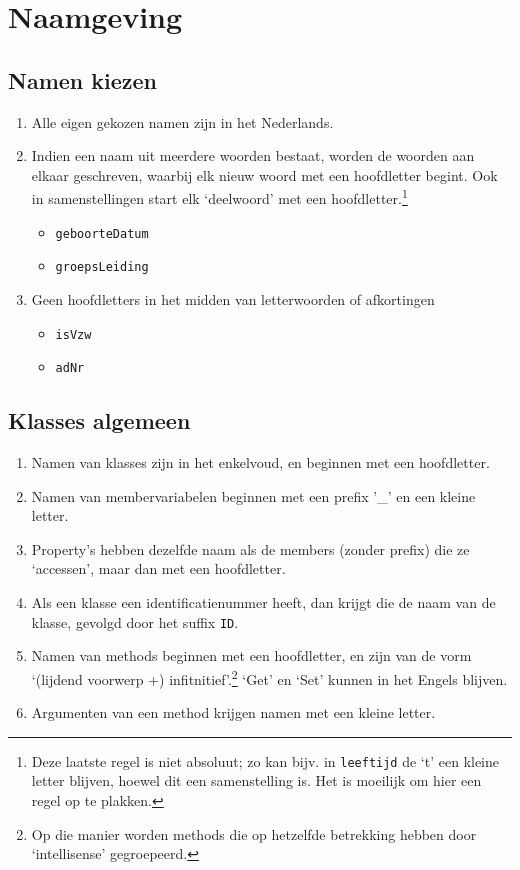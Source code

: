 \documentclass[a4paper,11pt]{article}
\begin{document}
\section{Naamgeving}

\subsection{Namen kiezen}

\begin{enumerate}[resume]
\item Alle eigen gekozen namen zijn in het Nederlands. 
\item Indien een naam uit meerdere woorden bestaat, worden de woorden aan elkaar geschreven,
waarbij elk nieuw woord met een hoofdletter begint.  Ook in samenstellingen start elk
`deelwoord' met een hoofdletter.\footnote{Deze laatste regel is niet absoluut; zo kan bijv. in
\lstinline !leeftijd! de `t' een kleine letter blijven, hoewel dit een samenstelling is.  Het is moeilijk om hier een regel op te
plakken.}
\begin{itemize}
\item \lstinline !geboorteDatum!
\item \lstinline !groepsLeiding!
\end{itemize}
\item Geen hoofdletters in het midden van letterwoorden of afkortingen
\begin{itemize}
\item \lstinline !isVzw!
\item \lstinline !adNr!
\end{itemize}
\end{enumerate}

\subsection{Klasses algemeen}

\begin{enumerate}[resume]
\item Namen van klasses zijn in het enkelvoud, en beginnen met een hoofdletter.
\item Namen van membervariabelen beginnen met een prefix '\_' en een kleine letter.
\item Property's hebben dezelfde naam als de members (zonder prefix) die ze `accessen', maar dan met een
hoofdletter.
\item Als een klasse een identificatienummer heeft, dan krijgt die de naam van de klasse,
gevolgd door het suffix \lstinline !ID!.
\item Namen van methods beginnen met een hoofdletter, en zijn van de vorm `(lijdend voorwerp +)
infitnitief'.\footnote{Op die manier worden methods die op hetzelfde betrekking hebben
door `intellisense' gegroepeerd.}  `Get' en `Set' kunnen in het Engels blijven.
\item Argumenten van een method krijgen namen met een kleine letter.
\end{enumerate}
\end{document}

